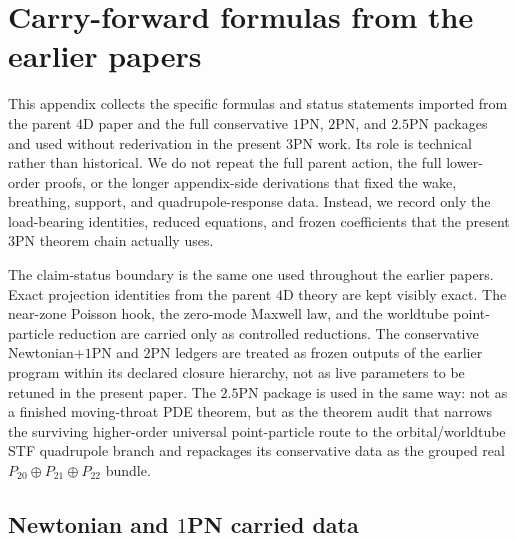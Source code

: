 \documentclass[11pt]{article}
\begin{document}
\appendix



\section{Carry-forward formulas from the earlier papers}
\label{app:carry-forward}

This appendix collects the specific formulas and status statements imported from
 the parent $4$D paper and the full conservative $1$PN, $2$PN, and $2.5$PN
 packages and used without rederivation in the present $3$PN work.  Its role is
 technical rather than historical.  We do not repeat the full parent action, the
 full lower-order proofs, or the longer appendix-side derivations that fixed the
 wake, breathing, support, and quadrupole-response data.  Instead, we record only
 the load-bearing identities, reduced equations, and frozen coefficients that the
 present $3$PN theorem chain actually uses.

The claim-status boundary is the same one used throughout the earlier papers.
Exact projection identities from the parent $4$D theory are kept visibly exact.
The near-zone Poisson hook, the zero-mode Maxwell law, and the worldtube
 point-particle reduction are carried only as controlled reductions.  The
 conservative Newtonian+$1$PN and $2$PN ledgers are treated as frozen outputs of
 the earlier program within its declared closure hierarchy, not as live
 parameters to be retuned in the present paper.  The $2.5$PN package is used in
 the same way: not as a finished moving-throat PDE theorem, but as the theorem
 audit that narrows the surviving higher-order universal point-particle route to
 the orbital/worldtube STF quadrupole branch and repackages its conservative data
 as the grouped real $P_{20}\oplus P_{21}\oplus P_{22}$ bundle.

\subsection{Newtonian and \texorpdfstring{$1$}{1}PN carried data}
\label{app:carry-forward-1pn}
\end{document}
